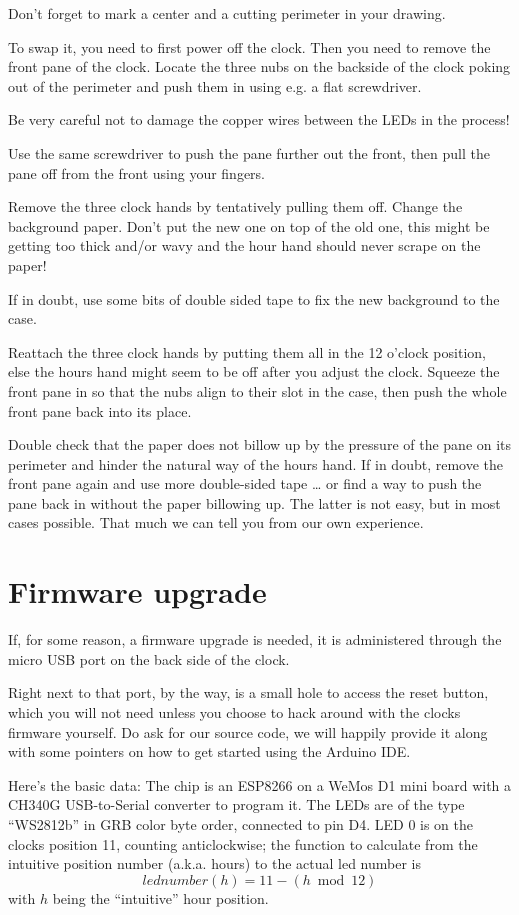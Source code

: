 \documentclass[a4paper,10pt,twocolumn]{article}
\begin{document}
Don't forget to mark a center and a cutting perimeter in your drawing.

To swap it, you need to first power off the clock. Then you need to remove the front 
pane of the clock. Locate the three nubs on the 
backside of the clock poking out of the perimeter and push them in using e.g. a flat screwdriver.

Be very careful not to damage the copper wires between the LEDs in the process! 

Use the same screwdriver to push the pane further out the front, then pull the pane off from 
the front using your fingers.

Remove the three clock hands by tentatively pulling them off. Change the background paper.
Don't put the new one on top of the old one, this might be getting too thick and/or wavy
and the hour hand should never scrape on the paper!

If in doubt, use some bits of double sided tape to fix the new background to the case.

Reattach the three clock hands by putting them all in the 12 o'clock position, else the 
hours hand might seem to be off after you adjust the clock. Squeeze the front pane in so 
that the nubs align to their slot in the case, then push the whole front pane back into 
its place.

Double check that the paper does not billow up by the pressure of the pane on its perimeter
and hinder the natural way of the hours hand. If in doubt, remove the front pane again and
use more double-sided tape \dots{} or find a way to push the pane back in without the paper
billowing up. The latter is not easy, but in most cases possible. That much we can tell 
you from our own experience.

\section{Firmware upgrade}
If, for some reason, a firmware upgrade is needed, it is administered through the micro 
USB port on the back side of the clock. 

Right next to that port, by the way, is a small
hole to access the reset button, which you will not need unless you choose to hack around
with the clocks firmware yourself. Do ask for our source code, we will happily provide it
along with some pointers on how to get started using the Arduino IDE.

Here's the basic data: The chip is an ESP8266 on a WeMos D1 mini board with a CH340G
USB-to-Serial converter to program it. The LEDs are 
of the type ``WS2812b'' in GRB color byte order, connected to pin D4. LED 0 is on the 
clocks position 11, counting anticlockwise; the function to calculate from the intuitive
position number (a.k.a. hours) to the actual led number is 
$$lednumber(h) = 11 - (h \bmod 12)$$
with $h$ being the ``intuitive'' hour position.
\end{document}
